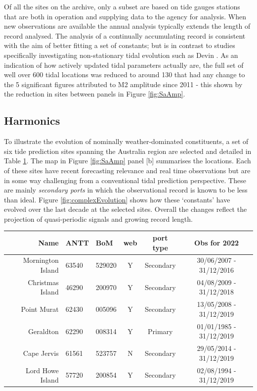 Of all the sites on the archive, only a subset are based on tide gauges stations that are both in operation and supplying data to the agency for analysis. When new observations are available the annual analysis typically extends the length of record analysed.   The analysis of a continually accumulating record is consistent with the aim of better fitting a set of constants; but is in contrast to studies specifically investigating non-stationary tidal evolution such as Devin \citep{10.1002/2017jc013165}.
As an indication of how actively updated tidal parameters actually are, the full set of well over 600 tidal locations was reduced to around 130 that had any change to the 5 significant figures attributed to M2 amplitude since 2011 - this shown by the reduction in sites between panels in Figure \ref{fig:SaAmp}.


\subsection{Harmonics}
To illustrate the evolution of nominally weather-dominated constituents, a set of six tide prediction sites spanning the Australia region are selected and detailed in Table \ref{tab:sites}.  The map in Figure  \ref{fig:SaAmp} panel [b] summarises the locations.
Each of these sites have recent forecasting relevance and real time observations but are in some way challenging from a conventional tidal prediction perspective.   These are mainly \textit{secondary ports} in which the observational record is known to be less than ideal. 
Figure \ref{fig:complexEvolution} shows how these `constants' have evolved over the last decade at the selected sites.   Overall the changes reflect the projection of quasi-periodic signals and growing record length.  

% 
\begin{table}\centering
\begin{tabular}{ r|p{1cm}|p{1.2cm}|c|c|c }
Name 
 & ANTT 
 & BoM 
 & web  
 & port type
 & Obs for 2022
  \\ 
\hline
Mornington Island 
 & 63540 
 & 529020 
 & Y 
 & Secondary 
 & 30/06/2007 - 31/12/2016
 \\
Christmas Island  
 & 46290 
 & 200970 
 & Y 
 & Secondary 
 & 04/08/2009 - 31/12/2018
 \\
Point Murat       
 & 62430 
 & 005096 
 & Y 
 & Secondary 
 & 13/05/2008 - 31/12/2019
 \\
Geraldton         
 & 62290 
 & 008314 
 & Y
 & Primary   
 & 01/01/1985 - 31/12/2019
 \\
Cape Jervis       
 & 61561 
 & 523757 
 & N 
 & Secondary
 & 29/05/2014 - 31/12/2019
 \\
Lord Howe Island  
 & 57720 
 & 200854  
 & Y 
 & Secondary 
 & 02/08/1994 - 31/12/2019
 \\
\end{tabular}
\label{tab:sites}
\end{table}

